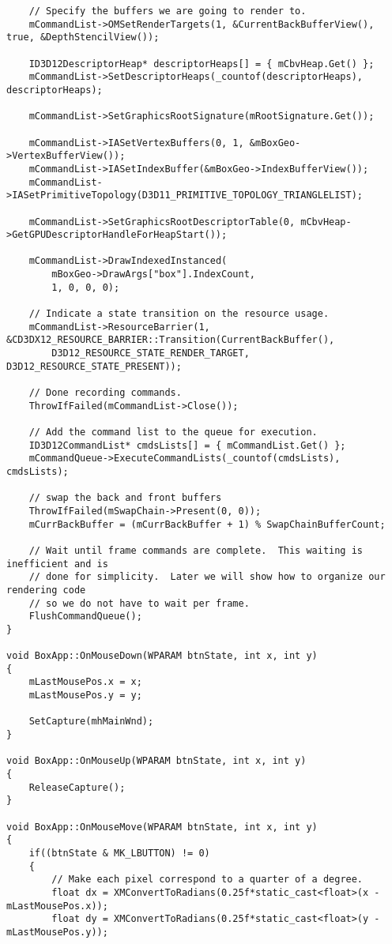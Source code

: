 \begin{lstlisting}
    // Specify the buffers we are going to render to.
    mCommandList->OMSetRenderTargets(1, &CurrentBackBufferView(), true, &DepthStencilView());

    ID3D12DescriptorHeap* descriptorHeaps[] = { mCbvHeap.Get() };
    mCommandList->SetDescriptorHeaps(_countof(descriptorHeaps), descriptorHeaps);

    mCommandList->SetGraphicsRootSignature(mRootSignature.Get());

    mCommandList->IASetVertexBuffers(0, 1, &mBoxGeo->VertexBufferView());
    mCommandList->IASetIndexBuffer(&mBoxGeo->IndexBufferView());
    mCommandList->IASetPrimitiveTopology(D3D11_PRIMITIVE_TOPOLOGY_TRIANGLELIST);
    
    mCommandList->SetGraphicsRootDescriptorTable(0, mCbvHeap->GetGPUDescriptorHandleForHeapStart());

    mCommandList->DrawIndexedInstanced(
        mBoxGeo->DrawArgs["box"].IndexCount, 
        1, 0, 0, 0);
    
    // Indicate a state transition on the resource usage.
    mCommandList->ResourceBarrier(1, &CD3DX12_RESOURCE_BARRIER::Transition(CurrentBackBuffer(),
        D3D12_RESOURCE_STATE_RENDER_TARGET, D3D12_RESOURCE_STATE_PRESENT));

    // Done recording commands.
    ThrowIfFailed(mCommandList->Close());
 
    // Add the command list to the queue for execution.
    ID3D12CommandList* cmdsLists[] = { mCommandList.Get() };
    mCommandQueue->ExecuteCommandLists(_countof(cmdsLists), cmdsLists);
    
    // swap the back and front buffers
    ThrowIfFailed(mSwapChain->Present(0, 0));
    mCurrBackBuffer = (mCurrBackBuffer + 1) % SwapChainBufferCount;

    // Wait until frame commands are complete.  This waiting is inefficient and is
    // done for simplicity.  Later we will show how to organize our rendering code
    // so we do not have to wait per frame.
    FlushCommandQueue();
}

void BoxApp::OnMouseDown(WPARAM btnState, int x, int y)
{
    mLastMousePos.x = x;
    mLastMousePos.y = y;

    SetCapture(mhMainWnd);
}

void BoxApp::OnMouseUp(WPARAM btnState, int x, int y)
{
    ReleaseCapture();
}

void BoxApp::OnMouseMove(WPARAM btnState, int x, int y)
{
    if((btnState & MK_LBUTTON) != 0)
    {
        // Make each pixel correspond to a quarter of a degree.
        float dx = XMConvertToRadians(0.25f*static_cast<float>(x - mLastMousePos.x));
        float dy = XMConvertToRadians(0.25f*static_cast<float>(y - mLastMousePos.y));


\end{lstlisting}
